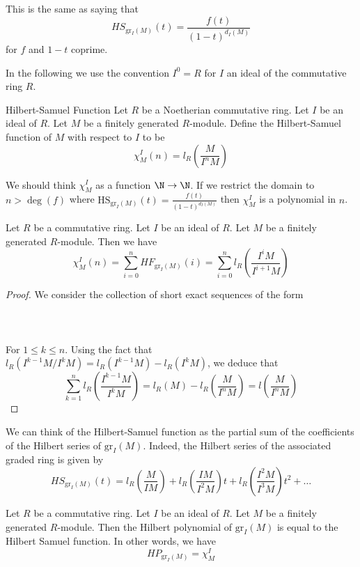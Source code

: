 \documentclass[a4paper]{article}
\begin{document}
This is the same as saying that $$HS_{\text{gr}_I(M)}(t)=\frac{f(t)}{(1-t)^{d_I(M)}}$$ for $f$ and $1-t$ coprime. 

In the following we use the convention $I^0=R$ for $I$ an ideal of the commutative ring $R$. 

\begin{defn}{Hilbert-Samuel Function}{} Let $R$ be a Noetherian commutative ring. Let $I$ be an ideal of $R$. Let $M$ be a finitely generated $R$-module. Define the Hilbert-Samuel function of $M$ with respect to $I$ to be $$\chi_M^I(n)=l_R\left(\frac{M}{I^nM}\right)$$
\end{defn}

We should think $\chi_M^I$ as a function $\N\to\N$. If we restrict the domain to $n>\deg(f)$ where $\text{HS}_{\text{gr}_I(M)}(t)=\frac{f(t)}{(1-t)^{d_I(M)}}$ then $\chi_M^I$ is a polynomial in $n$. 

\begin{prp}{}{} Let $R$ be a commutative ring. Let $I$ be an ideal of $R$. Let $M$ be a finitely generated $R$-module. Then we have $$\chi_M^I(n)=\sum_{i=0}^nHF_{\text{gr}_I(M)}(i)=\sum_{i=0}^nl_R\left(\frac{I^iM}{I^{i+1}M}\right)$$ 
\begin{proof}
We consider the collection of short exact sequences of the form \\~\\
 \\~\\
For $1\leq k\leq n$. Using the fact that $l_R(I^{k-1}M/I^kM)=l_R(I^{k-1}M)-l_R(I^kM)$, we deduce that $$\sum_{k=1}^nl_R\left(\frac{I^{k-1}M}{I^kM}\right)=l_R(M)-l_R\left(\frac{M}{I^nM}\right)=l\left(\frac{M}{I^nM}\right)$$
\end{proof}
\end{prp}

We can think of the Hilbert-Samuel function as the partial sum of the coefficients of the Hilbert series of $\text{gr}_I(M)$. Indeed, the Hilbert series of the associated graded ring is given by $$HS_{\text{gr}_I(M)}(t)=l_R\left(\frac{M}{IM}\right)+l_R\left(\frac{IM}{I^2M}\right)t+l_R\left(\frac{I^2M}{I^3M}\right)t^2+\dots$$

\begin{prp}{}{} Let $R$ be a commutative ring. Let $I$ be an ideal of $R$. Let $M$ be a finitely generated $R$-module. Then the Hilbert polynomial of $\text{gr}_I(M)$ is equal to the Hilbert Samuel function. In other words, we have $$HP_{\text{gr}_I(M)}=\chi_M^I$$
\end{prp}
\end{document}
